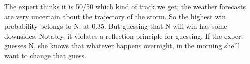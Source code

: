 \documentclass[
  11pt,
  letterpaper,
  DIV=11,
  numbers=noendperiod,
  twoside]{scrartcl}
\begin{document}
\begin{table}

\caption{\label{tbl-going}The expert's win probabilities, conditional on
the state of the track}

\begin{minipage}[t]{0.50\linewidth}



\end{minipage}%
%
\begin{minipage}[t]{0.50\linewidth}



\end{minipage}%

\end{table}%

The expert thinks it is 50/50 which kind of track we get; the weather
forecasts are very uncertain about the trajectory of the storm. So the
highest win probability belongs to N, at 0.35. But guessing that N will
win has some downsides. Notably, it violates a reflection principle for
guessing. If the expert guesses N, she knows that whatever happens
overnight, in the morning she'll want to change that guess.
\end{document}
